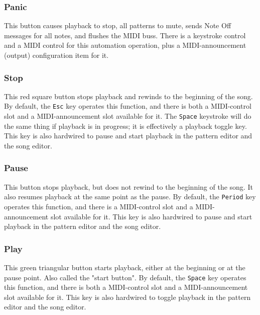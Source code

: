 \subsubsection{Panic}
\label{subsubsec:introduction_panic_button}

   This button causes playback to stop, all patterns to mute, sends
   Note Off messages for all notes, and flushes the
   MIDI buss.
   There is a keystroke control and a MIDI control
   for this automation operation, plus
   a MIDI-announcement (output) configuration item for it.

\subsubsection{Stop}
\label{subsubsec:introduction_stop_button}

   This red square button stops playback and
   rewinds to the beginning of the song.
   By default, the \texttt{Esc} key operates this function,
   and there is both a MIDI-control slot and a MIDI-announcement slot
   available for it.
   The \texttt{Space} keystroke will do the same thing if playback is in
   progress; it is effectively a playback toggle key.
   This key is also
   hardwired to pause and start playback in the pattern editor and the song
   editor.

\subsubsection{Pause}
\label{subsubsec:introduction_pause_button}

   This button stops playback, but does not rewind to the beginning of the
   song.  It also resumes playback at the same point as the pause.  By default,
   the \texttt{Period} key operates this function, and there is a MIDI-control
   slot and a MIDI-announcement slot available for it.
   This key is also
   hardwired to pause and start playback in the pattern editor and the song
   editor.

\subsubsection{Play}
\label{subsubsec:introduction_play_button}

   This green triangular button starts playback, either at the
   beginning or at the pause point.
   Also called the "start button".
   By default, the \texttt{Space} key operates this function,
   and there is both a MIDI-control slot and a MIDI-announcement slot
   available for it.
   This key is also hardwired to toggle playback in the pattern editor and the
   song editor.


